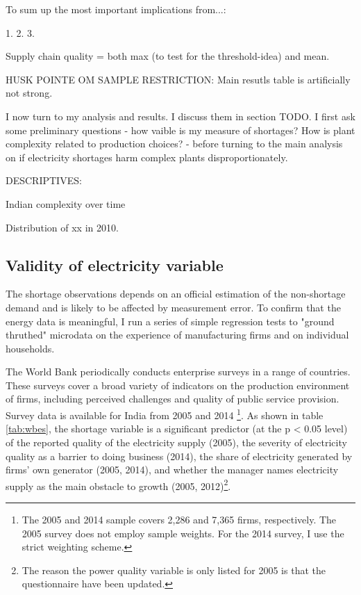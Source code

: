 \documentclass[11pt]{article}
\begin{document}
To sum up the most important implications from...:

1.
2. 
3.

Supply chain quality = both max (to test for the threshold-idea) and mean.

HUSK POINTE OM SAMPLE RESTRICTION: Main resutls table is artificially not strong.

I now turn to my analysis and results. I discuss them in section TODO. I first ask some preliminary questions - how vaible is my measure of shortages? How is plant complexity related to production choices? - before turning to the main analysis on if electricity shortages harm complex plants disproportionately. 

DESCRIPTIVES:

Indian complexity over time

Distribution of xx in 2010. 

\subsection{Validity of electricity variable}%
\label{sub:validity_of_electricity_variable}

The shortage observations depends on an official estimation of the non-shortage demand and is likely to be affected by measurement error. To confirm that the energy data is meaningful, I run a series of simple regression tests to "ground thruthed" microdata on the experience of manufacturing firms and on individual households. 

The World Bank periodically conducts enterprise surveys in a range of countries. These surveys cover a broad variety of indicators on the production environment of firms, including perceived challenges and quality of public service provision. Survey data is available for India from 2005 and 2014 \citep{world_bank_enterprise_2020-1,world_bank_enterprise_2020-2}\footnote{The 2005 and 2014 sample covers 2,286 and 7,365 firms, respectively. The 2005 survey does not employ sample weights. For the 2014 survey, I use the strict weighting scheme.}. As shown in table \ref{tab:wbes}, the shortage variable is a significant predictor (at the p < 0.05 level) of the reported quality of the electricity supply (2005), the severity of electricity quality as a barrier to doing business (2014), the share of electricity generated by firms' own generator (2005, 2014), and whether the manager names electricity supply as the main obstacle to growth (2005, 2012)\footnote{The reason the power quality variable is only listed for 2005 is that the questionnaire have been updated.}.
\end{document}
